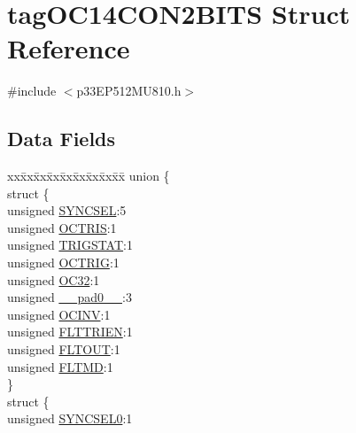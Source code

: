 \hypertarget{structtag_o_c14_c_o_n2_b_i_t_s}{}\section{tag\+O\+C14\+C\+O\+N2\+B\+I\+TS Struct Reference}
\label{structtag_o_c14_c_o_n2_b_i_t_s}


{\ttfamily \#include $<$p33\+E\+P512\+M\+U810.\+h$>$}

\subsection*{Data Fields}
\begin{DoxyCompactItemize}
\item 
\begin{tabbing}
xx\=xx\=xx\=xx\=xx\=xx\=xx\=xx\=xx\=\kill
union \{\\
\>struct \{\\
\>\>unsigned \hyperlink{structtag_o_c14_c_o_n2_b_i_t_s_a35fbbe11485c2615ed27535b62c3fa35}{SYNCSEL}:5\\
\>\>unsigned \hyperlink{structtag_o_c14_c_o_n2_b_i_t_s_ab849a74c6179282ed6b06cc047c80544}{OCTRIS}:1\\
\>\>unsigned \hyperlink{structtag_o_c14_c_o_n2_b_i_t_s_ab379549de54ac93ad4aa73686c34cb7c}{TRIGSTAT}:1\\
\>\>unsigned \hyperlink{structtag_o_c14_c_o_n2_b_i_t_s_a8d2cf9b996ef2b9079defa8950de798c}{OCTRIG}:1\\
\>\>unsigned \hyperlink{structtag_o_c14_c_o_n2_b_i_t_s_af52e127483a703e0fa84c7d4f1de0df4}{OC32}:1\\
\>\>unsigned \hyperlink{structtag_o_c14_c_o_n2_b_i_t_s_adf71f3d8410c1f1dbbc96680a92c49af}{\_\_pad0\_\_}:3\\
\>\>unsigned \hyperlink{structtag_o_c14_c_o_n2_b_i_t_s_a301004fca40c8d19d418866c92c19a06}{OCINV}:1\\
\>\>unsigned \hyperlink{structtag_o_c14_c_o_n2_b_i_t_s_ab979b75e02643aa840fb6ee50e0c30fa}{FLTTRIEN}:1\\
\>\>unsigned \hyperlink{structtag_o_c14_c_o_n2_b_i_t_s_ae466664b094d9c830e9ce20b86d7907f}{FLTOUT}:1\\
\>\>unsigned \hyperlink{structtag_o_c14_c_o_n2_b_i_t_s_a245ca3019d6c6ccbfb09f1c821146bb5}{FLTMD}:1\\
\>\} \\
\>struct \{\\
\>\>unsigned \hyperlink{structtag_o_c14_c_o_n2_b_i_t_s_a3b5df3154fde5141e6ac0156425ff8b4}{SYNCSEL0}:1\\

\end{tabbing}
\end{DoxyCompactItemize}
